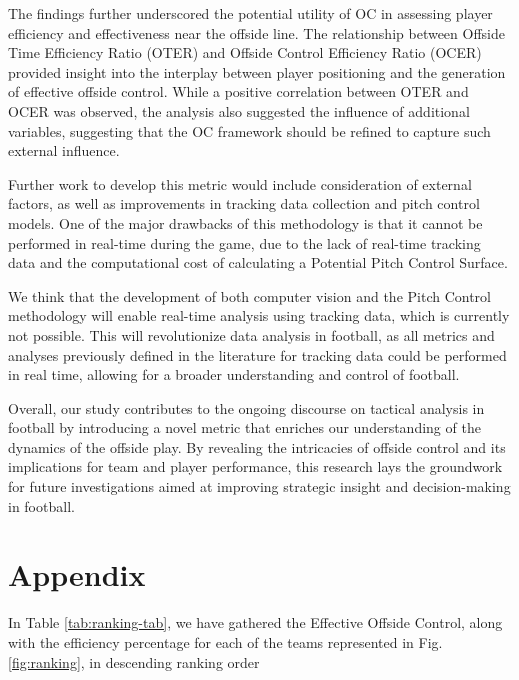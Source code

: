 \documentclass[
  10pt,
  twoside,nohyper]{book}
\begin{document}
The findings further underscored the potential utility of OC in assessing player efficiency and effectiveness near the offside line. The relationship between Offside Time Efficiency Ratio (OTER) and Offside Control Efficiency Ratio (OCER) provided insight into the interplay between player positioning and the generation of effective offside control. While a positive correlation between OTER and OCER was observed, the analysis also suggested the influence of additional variables, suggesting that the OC framework should be refined to capture such external influence.

Further work to develop this metric would include consideration of external factors, as well as improvements in tracking data collection and pitch control models. One of the major drawbacks of this methodology is that it cannot be performed in real-time during the game, due to the lack of real-time tracking data and the computational cost of calculating a Potential Pitch Control Surface.

We think that the development of both computer vision and the Pitch Control methodology will enable real-time analysis using tracking data, which is currently not possible. This will revolutionize data analysis in football, as all metrics and analyses previously defined in the literature for tracking data could be performed in real time, allowing for a broader understanding and control of football.

Overall, our study contributes to the ongoing discourse on tactical analysis in football by introducing a novel metric that enriches our understanding of the dynamics of the offside play. By revealing the intricacies of offside control and its implications for team and player performance, this research lays the groundwork for future investigations aimed at improving strategic insight and decision-making in football.

\chapter{Appendix}\label{appendix}

In Table \ref{tab:ranking-tab}, we have gathered the Effective Offside Control, along with the efficiency percentage for each of the teams represented in Fig. \ref{fig:ranking}, in descending ranking order
\end{document}
